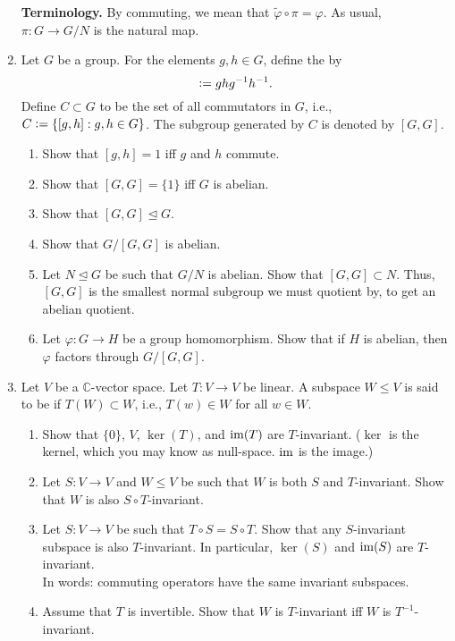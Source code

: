 \documentclass[12pt]{article}
\begin{document}
\begin{enumerate}
	\textbf{Terminology.} By  commuting, we mean that $\widetilde{\varphi} \circ \pi = \varphi$. As usual, $\pi : G \to G/N$ is the natural map.
	\item Let $G$ be a group. For the elements $g, h \in G$, define the  by
	\begin{equation*} 
		[g, h] \vcentcolon= ghg^{-1}h^{-1}.
	\end{equation*} 
	Define $C \subset G$ to be the set of all commutators in $G$, i.e., $C \vcentcolon= \{[g, h] : g, h \in G\}$. The subgroup generated by $C$ is denoted by $[G, G]$. 
	\begin{enumerate}
		\item Show that $[g, h] = 1$ iff $g$ and $h$ commute. 
		\item Show that $[G, G] = \{1\}$ iff $G$ is abelian.
		\item Show that $[G, G] \unlhd G$.
		\item Show that $G/[G, G]$ is abelian.
		\item Let $N \unlhd G$ be such that $G/N$ is abelian. Show that $[G, G] \subset N$. Thus, $[G, G]$ is the smallest normal subgroup we must quotient by, to get an abelian quotient.
		\item Let $\varphi : G \to H$ be a group homomorphism. Show that if $H$ is abelian, then $\varphi$ factors through $G/[G, G]$.
	\end{enumerate}
	\item Let $V$ be a $\mathbb{C}$-vector space. Let $T : V \to V$ be linear. A subspace $W \le V$ is said to be  if $T(W) \subset W$, i.e., $T(w) \in W$ for all $w \in W$.
	\begin{enumerate}
		\item Show that $\{0\}$, $V$, $\ker(T)$, and $\operatorname{im}(T)$ are $T$-invariant. ($\ker$ is the kernel, which you may know as null-space. $\operatorname{im}$ is the image.)
		\item Let $S : V \to V$ and $W \le V$ be such that $W$ is both $S$ and $T$-invariant. Show that $W$ is also $S \circ T$-invariant.
		\item Let $S : V \to V$ be such that $T \circ S = S \circ T$. Show that any $S$-invariant subspace is also $T$-invariant. In particular, $\ker(S)$ and $\operatorname{im}(S)$ are $T$-invariant. \\
		In words: commuting operators have the same invariant subspaces.
		\item Assume that $T$ is invertible. Show that $W$ is $T$-invariant iff $W$ is $T^{-1}$-invariant.

\end{enumerate}
\end{enumerate}
\end{document}
